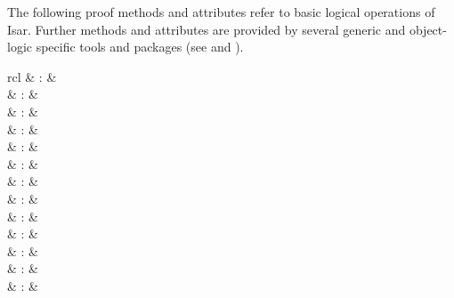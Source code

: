 \begin{isabellebody}
\begin{isamarkuptext}
\begin{descr}
  \end{descr}%
\end{isamarkuptext}%
\isamarkuptrue%
%
\isamarkuptrue%
%
\begin{isamarkuptext}%
The following proof methods and attributes refer to basic logical
  operations of Isar.  Further methods and attributes are provided by
  several generic and object-logic specific tools and packages (see
   and ).

  \begin{matharray}{rcl}
    \hypertarget{method.-}{\hyperlink{method.-}{\mbox{\isa{{\isacharminus}}}}} & : & \isarmeth \\
    \hypertarget{method.fact}{\hyperlink{method.fact}{\mbox{}}} & : & \isarmeth \\
    \hypertarget{method.assumption}{\hyperlink{method.assumption}{\mbox{}}} & : & \isarmeth \\
    \hypertarget{method.this}{\hyperlink{method.this}{\mbox{}}} & : & \isarmeth \\
    \hypertarget{method.rule}{\hyperlink{method.rule}{\mbox{}}} & : & \isarmeth \\
    \hypertarget{method.iprover}{\hyperlink{method.iprover}{\mbox{}}} & : & \isarmeth \\[0.5ex]
    \hypertarget{attribute.Pure.intro}{\hyperlink{attribute.Pure.intro}{\mbox{}}} & : & \isaratt \\
    \hypertarget{attribute.Pure.elim}{\hyperlink{attribute.Pure.elim}{\mbox{}}} & : & \isaratt \\
    \hypertarget{attribute.Pure.dest}{\hyperlink{attribute.Pure.dest}{\mbox{}}} & : & \isaratt \\
    \hypertarget{attribute.rule}{\hyperlink{attribute.rule}{\mbox{}}} & : & \isaratt \\[0.5ex]
    \hypertarget{attribute.OF}{\hyperlink{attribute.OF}{\mbox{}}} & : & \isaratt \\
    \hypertarget{attribute.of}{\hyperlink{attribute.of}{\mbox{}}} & : & \isaratt \\
    \hypertarget{attribute.where}{\hyperlink{attribute.where}{\mbox{}}} & : & \isaratt \\
  \end{matharray}


\end{isamarkuptext}
\end{isabellebody}
